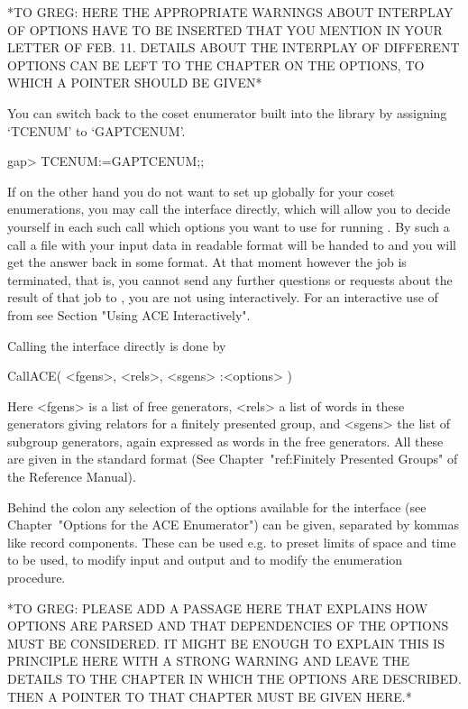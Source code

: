 *TO  GREG: 
HERE THE  APPROPRIATE WARNINGS ABOUT  INTERPLAY OF OPTIONS HAVE  TO BE
INSERTED THAT YOU MENTION IN YOUR LETTER OF FEB. 11. DETAILS ABOUT THE
INTERPLAY  OF DIFFERENT  OPTIONS CAN  BE LEFT  TO THE  CHAPTER  ON THE
OPTIONS, TO WHICH A POINTER SHOULD BE GIVEN*

You  can switch back  to the  coset enumerator  built into  the {\GAP}
library by assigning `TCENUM' to `GAPTCENUM'.


\begintt
gap> TCENUM:=GAPTCENUM;;
\endtt



If on  the other hand you  do not want  to set up {\ACE}  globally for
your coset  enumerations, you may call the  {\ACE} interface directly,
which  will allow  you  to decide  yourself  in each  such call  which
options you  want to use  for running {\ACE}.   By such a call  a file
with  your input  data in  {\ACE} readable  format will  be  handed to
{\ACE} and you will get the answer back in some {\GAP} format. At that
moment however the {\ACE} job  is terminated, that is, you cannot send
any  further questions or  requests about  the result  of that  job to
{\ACE}, you  are not using  {\ACE} interactively.  For  an interactive
use of {\ACE} from {\GAP} see Section "Using ACE Interactively".

Calling the {\ACE} interface directly is done by

\>CallACE( <fgens>, <rels>, <sgens> :<options> )

Here <fgens> is  a list of free generators, <rels> a  list of words in
these generators  giving relators for a finitely  presented group, and
<sgens> the list  of subgroup generators, again expressed  as words in
the free generators. All these are given in the standard {\GAP} format
(See Chapter~"ref:Finitely  Presented Groups" of  the {\GAP} Reference
Manual).

Behind  the colon  any  selection  of the  options  available for  the
interface (see Chapter~"Options for the ACE Enumerator") can be given,
separated by kommas like record components.  These can be used e.g. to
preset limits of space and time to be used, to modify input and output
and to modify the enumeration procedure.

*TO GREG:  
PLEASE ADD  A PASSAGE  HERE THAT EXPLAINS  HOW OPTIONS ARE  PARSED AND
THAT  DEPENDENCIES OF  THE OPTIONS  MUST  BE CONSIDERED.  IT MIGHT  BE
ENOUGH TO  EXPLAIN THIS  IS PRINCIPLE HERE  WITH A STRONG  WARNING AND
LEAVE  THE   DETAILS  TO  THE   CHAPTER  IN  WHICH  THE   OPTIONS  ARE
DESCRIBED. THEN A POINTER TO THAT CHAPTER MUST BE GIVEN HERE.*

